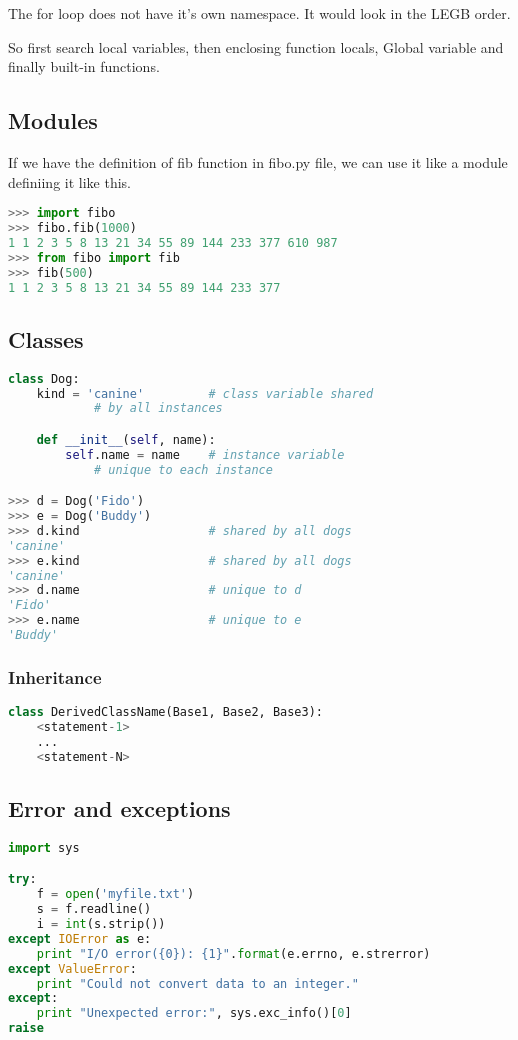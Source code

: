 \documentclass[fleqn,10pt]{SelfArx} %
\begin{document}
	The for loop does not have it's own namespace. It would look in the LEGB order.
	
	So first search local variables, then enclosing function locals, Global variable and finally built-in functions.

	\subsection{Modules}
	If we have the definition of fib function in fibo.py file, we can use it like a module definiing it like this.
	\begin{lstlisting}[language=Python, basicstyle=\scriptsize]
>>> import fibo
>>> fibo.fib(1000)
1 1 2 3 5 8 13 21 34 55 89 144 233 377 610 987
>>> from fibo import fib
>>> fib(500)
1 1 2 3 5 8 13 21 34 55 89 144 233 377
	\end{lstlisting}
	
	\subsection{Classes}

	\begin{lstlisting}[language=Python, basicstyle=\scriptsize]
class Dog:
	kind = 'canine'         # class variable shared 
			# by all instances

	def __init__(self, name):
		self.name = name    # instance variable 
			# unique to each instance

>>> d = Dog('Fido')
>>> e = Dog('Buddy')
>>> d.kind                  # shared by all dogs
'canine'
>>> e.kind                  # shared by all dogs
'canine'
>>> d.name                  # unique to d
'Fido'
>>> e.name                  # unique to e
'Buddy'
	\end{lstlisting}
	
	\subsubsection{Inheritance}
	\begin{lstlisting}[language=Python, basicstyle=\scriptsize]
class DerivedClassName(Base1, Base2, Base3):
	<statement-1>
	...
	<statement-N>
	\end{lstlisting}
	
	\subsection{Error and exceptions}

	\begin{lstlisting}[language=Python, basicstyle=\scriptsize]
import sys

try:
	f = open('myfile.txt')
	s = f.readline()
	i = int(s.strip())
except IOError as e:
	print "I/O error({0}): {1}".format(e.errno, e.strerror)
except ValueError:
	print "Could not convert data to an integer."
except:
	print "Unexpected error:", sys.exc_info()[0]
raise
	\end{lstlisting}
	
\end{document}
